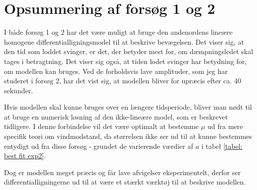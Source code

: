 \section{Opsummering af forsøg 1 og 2}
I både forsøg 1 og 2 har det være muligt at bruge den andenordens lineære homogene differentialligningsmodel til at beskrive bevægelsen. 
Det viser sig, at den tid som loddet svinger, er det, der betyder mest for, om dæmpningsledet skal tages i betragtning. 
Det viser sig også, at tiden lodet svinger har betydning for, om modellen kan bruges. 
Ved de forholdsvis lave amplituder, som jeg har studeret i forsøg 2, har det vist sig, at modellen bliver for upræcis efter ca. 40 sekunder. 

Hvis modellen skal kunne bruges over en længere tidsperiode, bliver man nødt til at bruge en numerisk løsning af den ikke-lineære model, som er beskrevet tidligere.
I denne forbindelse vil det være optimalt at bestemme $\mu$ ud fra mere specifik teori om vindmodstand, da størrelsen ikke ser ud til at kunne bestemmes entydigt ud fra disse forsøg - grundet de varierende værdier af $a$ i tabel \ref{tabel: best fit exp2}.

Dog er modellen meget præcis og får lave afvigelser eksperimentelt, derfor ser differentialligningerne ud til at være et stærkt værktøj til at beskrive modellen. 

